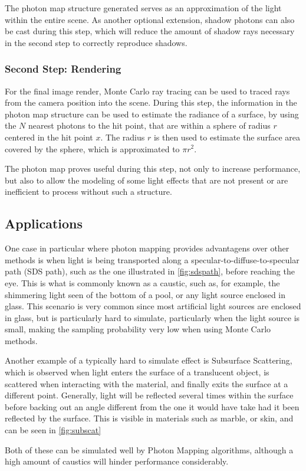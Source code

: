 \documentclass[main.tex]{subfiles}
\begin{document}
The photon map structure generated serves as an approximation of the light within the entire scene. As another optional extension, shadow photons can also be cast during this step, which will reduce the amount of shadow rays necessary in the second step to correctly reproduce shadows.


\subsubsection{Second Step: Rendering}

For the final image render, Monte Carlo ray tracing \cite{jensen2003monte} can be used to traced rays from the camera position into the scene. During this step, the information in the photon map structure can be used to estimate the radiance of a surface, by using the $N$ nearest photons to the hit point, that are within a sphere of radius $r$ centered in the hit point $x$. The radius $r$ is then used to estimate the surface area covered by the sphere, which is approximated to $\pi r^{2}$.

The photon map proves useful during this step, not only to increase performance, but also to allow the modeling of some light effects that are not present or are inefficient to process without such a structure.



\subsection{Applications}

One case in particular where photon mapping provides advantagens over other methods is when light is being transported along a specular-to-diffuse-to-specular path (SDS path), such as the one illustrated in \cref{fig:sdspath}, before reaching the eye. This is what is commonly known as a caustic, such as, for example, the shimmering light seen of the bottom of a pool, or any light source enclosed in glass. This scenario is very common since most artificial light sources are enclosed in glass, but is particularly hard to simulate, particularly when the light source is small, making the sampling probability very low when using Monte Carlo methods.


Another example of a typically hard to simulate effect is Subsurface Scattering, which is observed when light enters the surface of a translucent object, is scattered when interacting with the material, and finally exits the surface at a different point. Generally, light will be reflected several times within the surface before backing out an angle different from the one it would have take had it been reflected by the surface. This is visible in materials such as marble, or skin, and can be seen in \cref{fig:subscat}


Both of these can be simulated well by Photon Mapping algorithms, although a high amount of caustics will hinder performance considerably.
\end{document}
